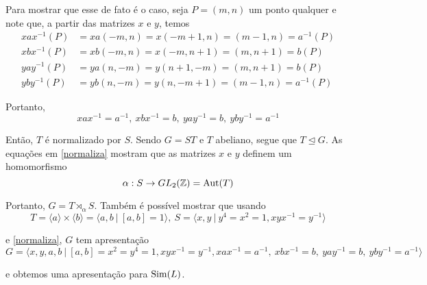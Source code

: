     	\par\vspace{0.3cm} Para mostrar que esse de fato é o caso, seja $P = (m,n)$ um ponto qualquer e 
    	note que, a partir das matrizes $x$ e $y$, temos
    	\begin{align*}
        	xax^{-1}(P) &= xa(-m,n) = x(-m+1, n) = (m-1, n) = a^{-1}(P) \\
        	xbx^{-1}(P) &= xb(-m,n) = x(-m, n+1) = (m, n+1) = b(P) \\
        	yay^{-1}(P) &= ya(n,-m) = y(n+1,-m) = (m, n+1) = b(P) \\
        	yby^{-1}(P) &= yb(n,-m) = y(n,-m+1) = (m-1,n) = a^{-1}(P)
    	\end{align*}
    	\par\vspace{0.3cm} Portanto,
    	\begin{equation}
    	\label{normaliza}
    	    xax^{-1} = a^{-1}, \ xbx^{-1} = b, \ yay^{-1} = b, \ yby^{-1} = a^{-1}
    	\end{equation}
    	\par\vspace{0.3cm} Então, $T$ é normalizado por $S$. Sendo $G=ST$ e $T$ abeliano, segue que
    	$T\trianglelefteq G$. As equações em \eqref{normaliza} mostram que as matrizes $x$ e $y$ definem 
    	um homomorfismo 
    	\begin{equation*}
    	    \alpha: S\to GL_2(\mathbb{Z}) = \operatorname{Aut}(T)
    	\end{equation*}
    	\par\vspace{0.3cm} Portanto, $G = T\rtimes_{\alpha} S$. Também é possível mostrar que usando
    	\begin{equation*}
    	    T = \langle a \rangle \times \langle b \rangle = \langle a,b \ | \ [a,b]=1 \rangle, \ 
    	    S = \langle x,y \ | \ y^4=x^2=1, xyx^{-1} = y^{-1} \rangle
    	\end{equation*}
    	\par\vspace{0.3cm} e \eqref{normaliza}, $G$ tem apresentação
    	\begin{equation*}
    	    G = \langle x,y,a,b \ | \ [a,b]=x^2=y^4=1,xyx^{-1} = y^{-1}, xax^{-1} = a^{-1}, \ 
    	    xbx^{-1} = b, \ yay^{-1} = b, \ yby^{-1} = a^{-1} \rangle
    	\end{equation*}
    	\par\vspace{0.3cm} e obtemos uma apresentação para $\operatorname{Sim}(L)$.
    	
